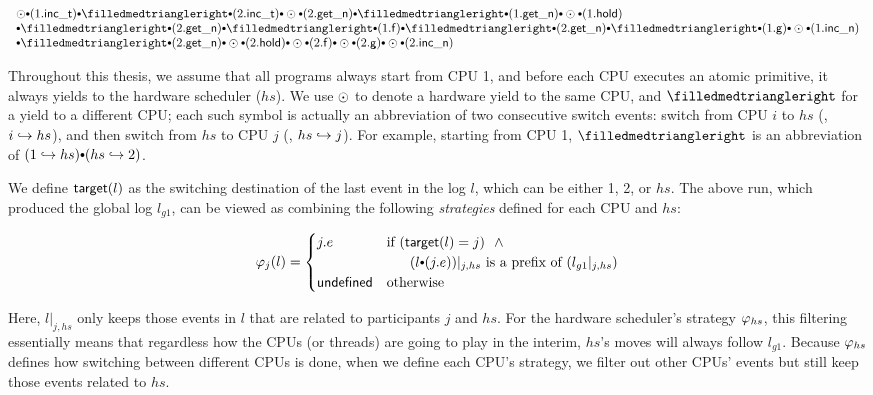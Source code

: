 \vspace*{-1ex}
\begin{small}
\[
\begin{array}{l}
\ssame \cons (1.\incticket) \cons
\sdiff \cons (2.\incticket) \cons
\ssame \cons (2.\getnow) \cons
\sdiff \cons (1.\getnow) \cons
\ssame \cons (1.\holdlock) 
\\
\cons 
\sdiff \cons (2.\getnow) \cons
\sdiff \cons (1.\comm{f}) \cons
\sdiff \cons (2.\getnow) \cons
\sdiff \cons (1.\comm{g}) \cons
\ssame \cons (1.\incnow) 
\\
\cons \sdiff \cons (2.\getnow) \cons
\ssame \cons (2.\holdlock) \cons
\ssame \cons (2.\comm{f}) \cons
\ssame \cons (2.\comm{g}) \cons
\ssame \cons (2.\incnow) 
\end{array}
\]
\end{small}%

Throughout this thesis, we assume that all programs always
start from CPU 1, and before each CPU executes an atomic primitive,
it always yields to the hardware scheduler ($hs$).
We use $\odot$ to denote a hardware yield to the same CPU,
and $\sdiff$ for a yield to a different CPU; each such symbol
is actually an abbreviation of two consecutive switch events: switch
from CPU $i$ to $hs$ (\ie, $i\hookrightarrow{}hs$), and then switch from $hs$
to CPU $j$ (\ie, $hs \hookrightarrow j$).  For example, starting from CPU 1,
$\sdiff$ is an abbreviation of $(1\switch{}hs) \cons (hs\switch 2)$.

We define $\mathsf{target}(l)$ as the switching destination of the last event in
the log $l$, which can be either 1, 2, or $hs$. The above run,
which produced the global log $l_{g1}$, can be viewed as combining
the following {\em strategies} defined for each CPU and $hs$:

\vspace*{-1ex}
\begin{small}
\[
\strat{j} (l)=
\begin{cases}
  j.e & \text{if } (\comm{target}(l) = j) ~~\wedge \\
      & ~~~~~(l\cons (j.e)) |_{j,hs} \text{ is a prefix of } (l_{g1} |_{j,hs}) \\
\comm{undefined } & \text{otherwise}
\end{cases}
\]
\end{small}%

\noindent{}Here, $l |_{j,hs}$ only keeps those events in $l$ that are
related to participants $j$ and $hs$.  For the hardware scheduler's
strategy $\varphi_{hs}$, this filtering essentially means that
regardless how the CPUs (or threads) are going to play in the interim,
$hs$'s moves will always follow $l_{g1}$.  Because $\varphi_{hs}$
defines how switching between different CPUs is done, when we define
each CPU's strategy, we filter out other CPUs' events but still keep
those events related to $hs$.

